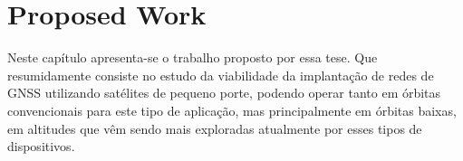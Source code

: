 %
%
%
%
%

%
%
%
%
%


\chapter{Proposed Work} \label{ch:proposed-work}

Neste capítulo apresenta-se o trabalho proposto por essa tese. Que resumidamente consiste no estudo da viabilidade da implantação de redes de GNSS utilizando satélites de pequeno porte, podendo operar tanto em órbitas convencionais para este tipo de aplicação, mas principalmente em órbitas baixas, em altitudes que vêm sendo mais exploradas atualmente por esses tipos de dispositivos.
